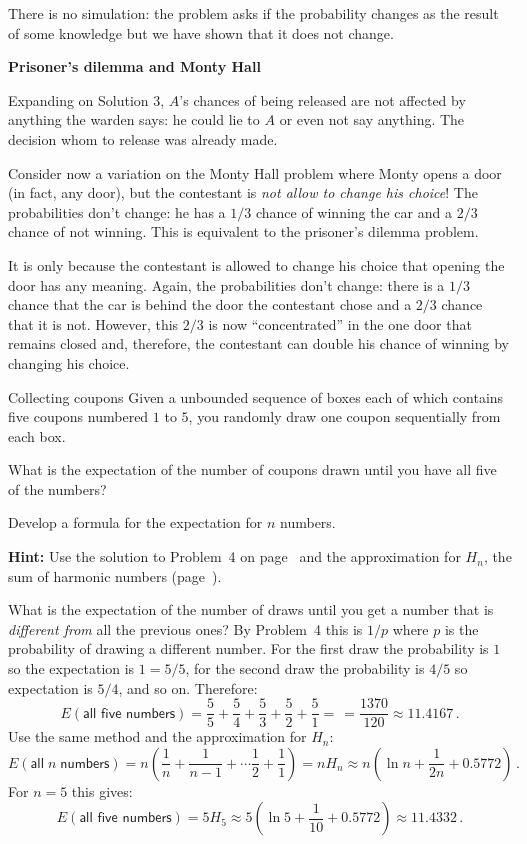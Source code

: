 \sml{}

There is no simulation: the problem asks if the probability changes as the result of some knowledge but we have shown that it does not change.

\bigskip

\textbf{\Large Prisoner's dilemma and Monty Hall}

\medskip

Expanding on Solution 3, $A$'s chances of being released are not affected by anything the warden says: he could lie to $A$ or even not say anything. The decision whom to release was already made.

Consider now a variation on the Monty Hall problem where Monty opens a door (in fact, any door), but the contestant is \emph{not allow to change his choice}! The probabilities don't change: he has a $1/3$ chance of winning the car and a $2/3$ chance of not winning. This is equivalent to the prisoner's dilemma problem.

It is only because the contestant is allowed to change his choice that opening the door has any meaning. Again, the probabilities don't change: there is a $1/3$ chance that the car is behind the door the contestant chose and a $2/3$ chance that it is not. However, this $2/3$ is now ``concentrated'' in the one door that remains closed and, therefore, the contestant can double his chance of winning by changing his choice.


\begin{prob}{Collecting coupons}
Given a unbounded sequence of boxes each of which contains five coupons numbered $1$ to $5$, you randomly draw one coupon sequentially from each box.

 What is the expectation of the number of coupons drawn until you have all five of the numbers?

 Develop a formula for the expectation for $n$ numbers.

\textbf{Hint:} Use the solution to Problem~4 on page~\pageref{p.four} and the approximation for $H_n$, the sum of harmonic numbers (page~\pageref{p.harmonic}).
\end{prob}

\solution{}

 What is the expectation of the number of draws until you get a  number that is \emph{different from} all the previous ones? By  Problem~4 this is $1/p$ where $p$ is the probability of drawing a different number. For the first draw the probability is $1$ so the expectation is $1=5/5$, for the second draw the probability is $4/5$ so expectation is $5/4$, and so on. Therefore:
\[
E(\textsf{all five numbers}) = \frac{5}{5}+\frac{5}{4} + \frac{5}{3} + \frac{5}{2} + \frac{5}{1} = \frac{}{} =\frac{1370}{120}\approx 11.4167\,.
\]
 Use the same method and the approximation for $H_n$:
\[
E(\textsf{all}\;n \;\textsf{numbers}) = n\left(\frac{1}{n}+\frac{1}{n-1} + \cdots \frac{1}{2} + \frac{1}{1}\right) =nH_n\approx n\left(\ln n + \frac{1}{2n} + 0.5772\right)\,. 
\]
For $n=5$ this gives:
\[
E(\textsf{all five numbers}) =5H_5\approx 5\left(\ln 5 + \frac{1}{10} + 0.5772\right) \approx 11.4332\,.
\]

